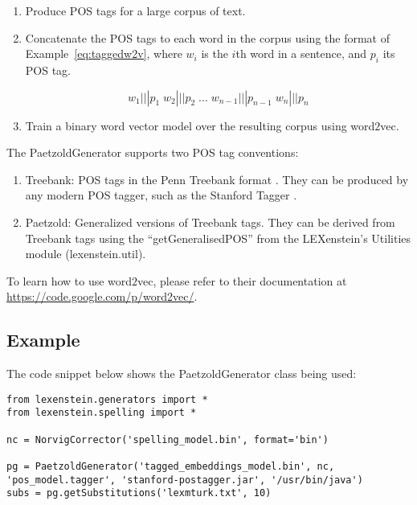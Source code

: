 	\begin{enumerate}
		\item Produce POS tags for a large corpus of text.
		\item Concatenate the POS tags to each word in the corpus using the format of Example~\ref{eq:taggedw2v}, where $w_{i}$ is the $i$th word in a sentence, and $p_{i}$ its POS tag.
			
		\begin{equation}
			\label{eq:taggedw2v}
				w_{1}|||p_{1}\; w_{2}|||p_{2}\;  ...\; w_{n-1}|||p_{n-1}\; w_{n}|||p_{n}
			\end{equation}
				
		\item Train a binary word vector model over the resulting corpus using word$2$vec.
	\end{enumerate}

The PaetzoldGenerator supports two POS tag conventions:
		
			\begin{enumerate}
				\item Treebank: POS tags in the Penn Treebank format \cite{Marcus1993}. They can be produced by any modern POS tagger, such as the Stanford Tagger \cite{stanfordparser}.
				
				\item Paetzold: Generalized versions of Treebank tags. They can be derived from Treebank tags using the ``getGeneralisedPOS'' from the LEXenstein's Utilities module (lexenstein.util).
			\end{enumerate}

To learn how to use word$2$vec, please refer to their documentation at \url{https://code.google.com/p/word2vec/}.



\subsection{Example}

The code snippet below shows the PaetzoldGenerator class being used:

\begin{lstlisting}
from lexenstein.generators import *
from lexenstein.spelling import *

nc = NorvigCorrector('spelling_model.bin', format='bin')

pg = PaetzoldGenerator('tagged_embeddings_model.bin', nc, 'pos_model.tagger', 'stanford-postagger.jar', '/usr/bin/java')
subs = pg.getSubstitutions('lexmturk.txt', 10)
\end{lstlisting}











